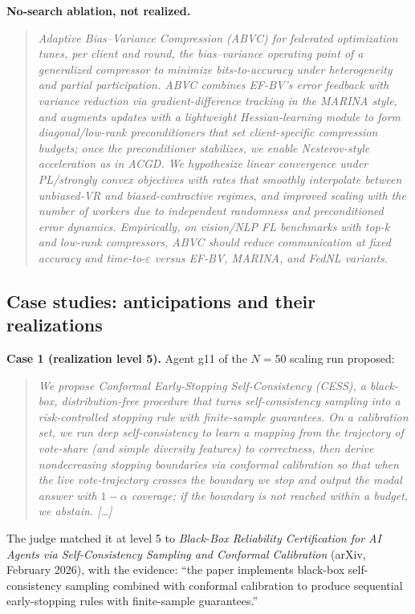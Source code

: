 \documentclass{article} %
\begin{document}
\textbf{No-search ablation, not realized.}
\begin{quote}\small\itshape
Adaptive Bias--Variance Compression (ABVC) for federated optimization tunes, per client and round, the bias--variance operating point of a generalized compressor to minimize bits-to-accuracy under heterogeneity and partial participation. ABVC combines EF-BV's error feedback with variance reduction via gradient-difference tracking in the MARINA style, and augments updates with a lightweight Hessian-learning module to form diagonal/low-rank preconditioners that set client-specific compression budgets; once the preconditioner stabilizes, we enable Nesterov-style acceleration as in ACGD. We hypothesize linear convergence under PL/strongly convex objectives with rates that smoothly interpolate between unbiased-VR and biased-contractive regimes, and improved scaling with the number of workers due to independent randomness and preconditioned error dynamics. Empirically, on vision/NLP FL benchmarks with top-k and low-rank compressors, ABVC should reduce communication at fixed accuracy and time-to-$\varepsilon$ versus EF-BV, MARINA, and FedNL variants.
\end{quote}

\subsection{Case studies: anticipations and their realizations}
\label{app:cases}

\textbf{Case 1 (realization level 5).} Agent g11 of the $N{=}50$
scaling run proposed:
\begin{quote}\small\itshape
We propose Conformal Early-Stopping Self-Consistency (CESS), a
black-box, distribution-free procedure that turns self-consistency
sampling into a risk-controlled stopping rule with finite-sample
guarantees. On a calibration set, we run deep self-consistency to learn
a mapping from the trajectory of vote-share (and simple diversity
features) to correctness, then derive nondecreasing stopping boundaries
via conformal calibration so that when the live vote-trajectory crosses
the boundary we stop and output the modal answer with $1-\alpha$
coverage; if the boundary is not reached within a budget, we abstain.
[\ldots]
\end{quote}
The judge matched it at level 5 to \emph{Black-Box Reliability
Certification for AI Agents via Self-Consistency Sampling and Conformal
Calibration} (arXiv, February 2026), with the evidence: ``the paper
implements black-box self-consistency sampling combined with conformal
calibration to produce sequential early-stopping rules with
finite-sample guarantees.''
\end{document}
